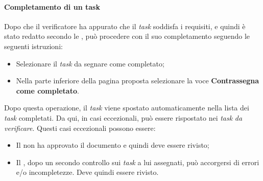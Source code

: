 \paragraph{Completamento di un task}
Dopo che il verificatore ha appurato che il \textit{task} soddisfa i requisiti, e quindi è stato redatto secondo le
\textit{\NdP}, può procedere con il suo completamento seguendo le seguenti istruzioni:
\begin{itemize}
  \item Selezionare il \textit{task} da segnare come completato;
  \item Nella parte inferiore della pagina proposta selezionare la voce \textbf{Contrassegna come completato}.
\end{itemize}
Dopo questa operazione, il \textit{task} viene spostato automaticamente nella lista dei \textit{task} completati. Da qui, in
casi eccezionali, può essere rispostato nei \textit{task} \textit{da verificare}. Questi casi eccezionali possono essere:
\begin{itemize}
  \item Il \textit{\RdP} non ha approvato il documento e quindi deve essere
  rivisto;
  \item Il \textit{\Ver}, dopo un secondo controllo sui \textit{task} a lui assegnati,
  può accorgersi di errori e/o incompletezze. Deve quindi essere rivisto.
\end{itemize}


